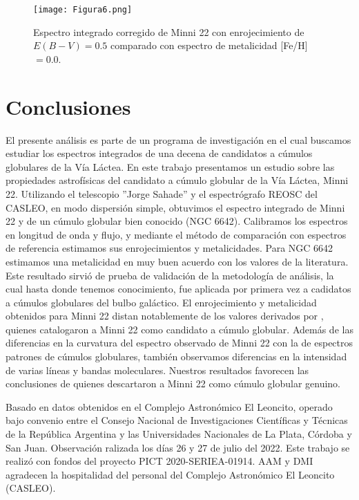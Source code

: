 \documentclass[baaa]{baaa}
\begin{document}
\begin{figure}
\centering
\texttt{[image: Figura6.png]}
\caption{Espectro integrado corregido de Minni 22 con enrojecimiento de $E(B-V)=0.5$ comparado con espectro de metalicidad [Fe/H] $=0.0$.}
\label{Figura6}
\end{figure}


\section{Conclusiones}

El presente análisis es parte de un programa de investigación en el cual buscamos estudiar los espectros integrados de una decena de candidatos a cúmulos globulares de la Vía Láctea. 
En este trabajo presentamos un estudio sobre las propiedades astrofísicas del candidato a cúmulo globular de la Vía Láctea, Minni 22. Utilizando el telescopio ''Jorge Sahade'' y el espectrógrafo REOSC del CASLEO, en modo dispersión simple, obtuvimos el espectro integrado de Minni 22 y de un cúmulo globular bien conocido (NGC 6642). 
Calibramos los espectros en longitud de onda y flujo, y mediante el método de comparación con espectros de referencia estimamos sus enrojecimientos y metalicidades.   Para NGC 6642 estimamos una metalicidad en muy buen acuerdo con los valores de la literatura. Este resultado sirvió de prueba de validación de la metodología de análisis, la cual hasta donde tenemos conocimiento, fue aplicada por primera vez a cadidatos a cúmulos globulares del bulbo galáctico.
El enrojecimiento y metalicidad obtenidos para Minni 22 distan notablemente de los valores derivados por \cite{minniti-2018}, quienes catalogaron a Minni 22 como candidato a cúmulo globular. Además de las diferencias en la curvatura del espectro observado de Minni 22 con la de espectros patrones de cúmulos globulares, también observamos diferencias en la intensidad de varias líneas y bandas moleculares. Nuestros resultados favorecen las conclusiones de \cite{minniti-2019} quienes
descartaron a Minni 22 como cúmulo globular genuino.




\begin{acknowledgement}
Basado en datos obtenidos en el Complejo Astronómico El Leoncito, operado bajo convenio entre el Consejo Nacional de Investigaciones Científicas y Técnicas de la República Argentina y las Universidades Nacionales de La Plata, Córdoba y San Juan. Observación ralizada los días 26 y 27 de julio del 2022.
Este trabajo se realizó con fondos del proyecto PICT 2020-SERIEA-01914. AAM y DMI agradecen la hospitalidad del personal del Complejo Astronómico El Leoncito (CASLEO).
\end{acknowledgement}
\end{document}
